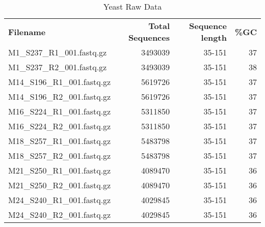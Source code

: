 \documentclass[10pt,a4paper]{article}
\begin{document}
\begin{table}[]
\centering
\begin{tabular}{l|r|r|r}
\textbf{Filename}           &\textbf{Total Sequences} & \textbf{Sequence length} & \textbf{\%GC} \\
M1\_S237\_R1\_001.fastq.gz  & 3493039                                      & 35-151                                       & 37                                \\
M1\_S237\_R2\_001.fastq.gz  & 3493039                                      & 35-151                                       & 38                                \\
M14\_S196\_R1\_001.fastq.gz & 5619726                                      & 35-151                                       & 37                                \\
M14\_S196\_R2\_001.fastq.gz & 5619726                                      & 35-151                                       & 37                                \\
M16\_S224\_R1\_001.fastq.gz & 5311850                                      & 35-151                                       & 37                                \\
M16\_S224\_R2\_001.fastq.gz & 5311850                                      & 35-151                                       & 37                                \\
M18\_S257\_R1\_001.fastq.gz & 5483798                                      & 35-151                                       & 37                                \\
M18\_S257\_R2\_001.fastq.gz & 5483798                                      & 35-151                                       & 37                                \\
M21\_S250\_R1\_001.fastq.gz & 4089470                                      & 35-151                                       & 36                                \\
M21\_S250\_R2\_001.fastq.gz & 4089470                                      & 35-151                                       & 36                                \\
M24\_S240\_R1\_001.fastq.gz & 4029845                                      & 35-151                                       & 36                                \\
M24\_S240\_R2\_001.fastq.gz & 4029845                                      & 35-151                                       & 36                               
\end{tabular}
\caption{Yeast Raw Data}
\label{tab:yeastfiles}
\end{table}
\end{document}
